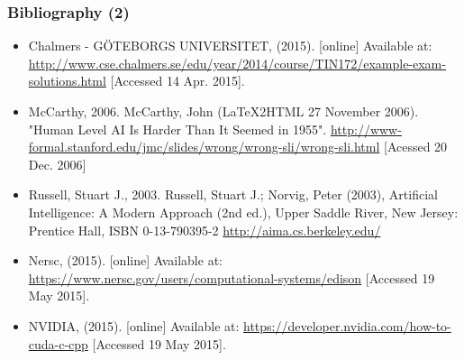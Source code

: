 \documentclass[10pt]{beamer}
\begin{document}
\begin{frame} [fragile]
\frametitle{Bibliography (2)}

	\begin{itemize}
	
	\item Chalmers - GÖTEBORGS UNIVERSITET, (2015). [online] Available at:  
	\url{http://www.cse.chalmers.se/edu/year/2014/course/TIN172/example-exam-solutions.html}
	[Accessed 14 Apr. 2015].

	\item McCarthy, 2006. McCarthy, John (LaTeX2HTML 27 November 2006). "Human
	Level AI Is Harder Than It Seemed in 1955".
	\url{http://www-formal.stanford.edu/jmc/slides/wrong/wrong-sli/wrong-sli.html}
	[Acessed 20 Dec. 2006]

	\item Russell, Stuart J., 2003. Russell, Stuart J.; Norvig, Peter (2003),
	Artificial Intelligence: A Modern Approach (2nd ed.), Upper Saddle River, New
	Jersey: Prentice Hall, ISBN 0-13-790395-2  \url{http://aima.cs.berkeley.edu/}

	\item Nersc, (2015). [online] Available at:
	\url{https://www.nersc.gov/users/computational-systems/edison} [Accessed 19 May
	2015].

	\item NVIDIA, (2015). [online] Available at:
	\url{https://developer.nvidia.com/how-to-cuda-c-cpp} [Accessed 19 May 2015].
	
	\end{itemize}
\end{frame}
\end{document}
